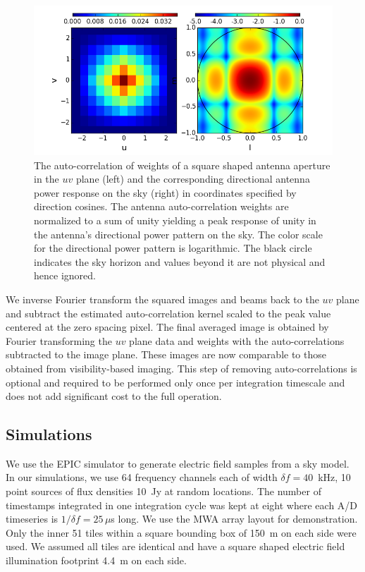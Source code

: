 \documentclass[a4paper,fleqn,usenatbib]{../mnras}
\begin{document}
\begin{figure}
  \includegraphics[width=\columnwidth]{autocorr_uvwts_pbeam.png}
  \caption{The auto-correlation of weights of a square shaped antenna aperture
    in the $uv$ plane (left) and the corresponding directional antenna power 
    response on the sky (right) in coordinates specified by direction cosines. 
    The antenna auto-correlation weights are normalized to a sum
    of unity yielding a peak response of unity in the antenna's directional
    power pattern on the sky. The color scale for the directional power 
    pattern is logarithmic. The black circle indicates the sky horizon and
    values beyond it are not physical and hence ignored.}
  \label{fig:autocorr_wts_PB}
\end{figure}

We inverse Fourier transform the squared images and beams back to the $uv$ 
plane and subtract the estimated auto-correlation kernel scaled to the peak 
value centered at the zero spacing pixel. The final averaged image is obtained 
by Fourier transforming the $uv$ plane data and weights with the 
auto-correlations subtracted to the image plane. These images are now comparable 
to those obtained from visibility-based imaging. This step of removing 
auto-correlations is optional and required to be performed only once per 
integration timescale and does not add significant cost to the full operation.

\subsection{Simulations}\label{sec:sim}

We use the EPIC simulator to generate electric field samples from a sky model. In
our simulations, we use 64 frequency channels each of width $\delta f = 40$~kHz, 
10 point sources of flux densities 10~Jy at random locations. The number of
timestamps integrated in one integration cycle was kept at eight where each A/D 
timeseries is $1/\delta f=25\,\mu$s long. We use the MWA array layout 
\citep{bea12} for demonstration. Only the inner 51 tiles within a square bounding
box of 150~m on each side were used. We assumed all tiles are identical and have 
a square shaped electric field illumination footprint 4.4~m on each side. 
\end{document}
